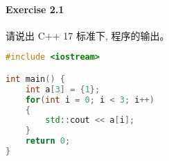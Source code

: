 \documentclass{article}
\begin{document}
	\paragraph*{Exercise 2.1} 
	
	请说出 C++ 17 标准下, 程序的输出。
	
	\begin{lstlisting}[language=C++]  		
#include <iostream>

int main() {
	int a[3] = {1};
	for(int i = 0; i < 3; i++)
	{
		std::cout << a[i];
	}
	return 0;
}
	\end{lstlisting}
	
\end{document}
